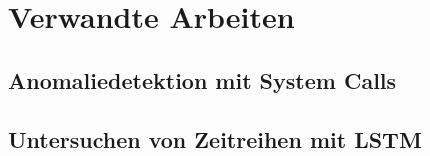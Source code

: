 \chapter{Verwandte Arbeiten}\label{ch:verwandte_arbeiten}
\section{Anomaliedetektion mit System Calls}

\section{Untersuchen von Zeitreihen mit LSTM}
